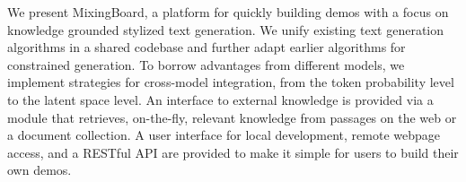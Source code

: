 We present MixingBoard, a platform for quickly building demos with a focus on knowledge grounded stylized text generation. We unify existing text generation algorithms in a shared codebase and further adapt earlier algorithms for constrained generation. To borrow advantages from different models, we implement strategies for cross-model integration, from the token probability level to the latent space level. An interface to external knowledge is provided via a module that retrieves, on-the-fly, relevant knowledge from passages on the web or a document collection. A user interface for local development, remote webpage access, and a RESTful API are provided to make it simple for users to build their own demos.
